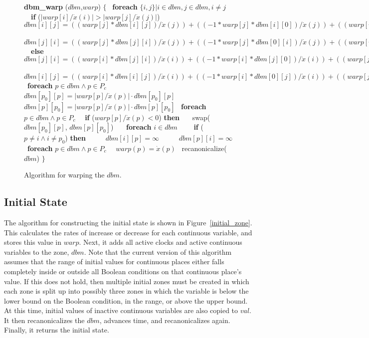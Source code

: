 \documentclass[11pt,times]{article}
\begin{document}
  \begin{figure}[htbp]
    \begin{algorithm}
      \small {\bf{dbm\_warp}} ($dbm$,$warp$) $\{$
      \ {\bf{foreach}} ${\{i,j\} | i \in dbm, j \in dbm, i \neq j}$
      \ \ {\bf{if}} ($\left| warp[i] / \dot{x}(i)\right| > \left| warp[j] / \dot{x}(j)\right|$)
      \ \ \ $dbm[i][j] = ((warp[j] * dbm[i][j]) / \dot{x}(j)) + ((-1 * warp[j] * dbm[i][0]) / \dot{x}(j)) + ((warp[i] * dbm[i][0]) / \dot{x}(i))$
      \ \ \ $dbm[j][i] = ((warp[j] * dbm[j][i]) / \dot{x}(j)) + ((-1 * warp[j] * dbm[0][i]) / \dot{x}(j)) + ((warp[i] * dbm[0][i]) / \dot{x}(i))$
      \ \ {\bf{else}} 
      \ \ \ $dbm[j][i] = ((warp[i] * dbm[j][i]) / \dot{x}(i)) + ((-1 * warp[i] * dbm[j][0]) / \dot{x}(i)) + ((warp[j] * dbm[j][0]) / \dot{x}(j))$
      \ \ \ $dbm[i][j] = ((warp[i] * dbm[i][j]) / \dot{x}(i)) + ((-1 * warp[i] * dbm[0][j]) / \dot{x}(i)) + ((warp[j] * dbm[0][j]) / \dot{x}(j))$
      \ {\bf{foreach}} $p \in dbm \wedge p \in P_c$
      \ \ $dbm[p_0][p] = \left| warp[p]/\dot{x}(p) \right| \cdot dbm[p_0][p]$
      \ \ $dbm[p][p_0] = \left| warp[p]/\dot{x}(p) \right| \cdot dbm[p][p_0]$
      \ {\bf{foreach}} $p \in dbm \wedge p \in P_c$
      \ \ {\bf{if}} ($warp[p]/\dot{x}(p) < 0$) {\bf{then}}
      \ \ \ swap($dbm[p_0][p]$, $dbm[p][p_0]$)
      \ \ \ {\bf{foreach}} $i \in dbm$
      \ \ \ \ {\bf{if}} ($p \neq i \wedge i \neq p_0$) {\bf{then}}
      \ \ \ \ \ $dbm[i][p] = \infty$
      \ \ \ \ \ $dbm[p][i] = \infty$
      \ {\bf{foreach}} $p \in dbm \wedge p \in P_c$ 
      \ \ $warp(p)=\dot{x}(p)$
      \ recanonicalize($dbm$)
    $\}$
    \end{algorithm}
    \caption{\label{dbm_warp}Algorithm for warping the $dbm$.}
  \end{figure}


\subsection{Initial State}

The algorithm for constructing the initial state is shown in
Figure~\ref{initial_zone}.  This calculates the rates of increase or decrease
for each continuous variable, and stores this value in $warp$.  Next, it adds 
all active clocks and active continuous variables to the zone, $dbm$.
Note that the current version of this algorithm assumes that the range of
initial values for continuous places either falls completely inside or outside
all Boolean conditions on that continuous place's value.  If this does not
hold, then multiple initial zones must be created in which each zone is 
split up into possibly three zones in which the variable is below the lower
bound on the Boolean condition, in the range, or above the upper bound. 
At this time, initial values of inactive continuous variables are also 
copied to $val$.  It then recanonicalizes the $dbm$, advances time, and 
recanonicalizes again.  Finally, it returns the initial state.
\end{document}
